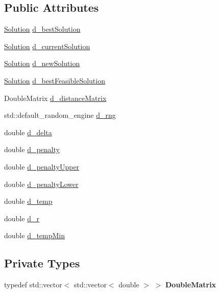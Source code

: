 \subsection*{Public Attributes}
\begin{DoxyCompactItemize}
\item 
\hyperlink{class_solution}{Solution} \hyperlink{class_env_a200b43f8ef6487fd256326a549616e78}{d\+\_\+best\+Solution}
\item 
\hyperlink{class_solution}{Solution} \hyperlink{class_env_a60f53202173a69954e643ef46f16062f}{d\+\_\+current\+Solution}
\item 
\hyperlink{class_solution}{Solution} \hyperlink{class_env_a6109a75656bf4b55567e57369d7b5aa5}{d\+\_\+new\+Solution}
\item 
\hyperlink{class_solution}{Solution} \hyperlink{class_env_a639c27f323c898cb9821f4c64b1a055a}{d\+\_\+best\+Feasible\+Solution}
\item 
Double\+Matrix \hyperlink{class_env_a2686d42335dbafb9c10ebdbe6362e613}{d\+\_\+distance\+Matrix}
\item 
std\+::default\+\_\+random\+\_\+engine \hyperlink{class_env_acde21783d6aed785a78cf914a7215383}{d\+\_\+rng}
\item 
double \hyperlink{class_env_a356dd226bf831c283818b459d66224c4}{d\+\_\+delta}
\item 
double \hyperlink{class_env_a75f5662133f2d29d710c2bf2e2a34229}{d\+\_\+penalty}
\item 
double \hyperlink{class_env_aa6ed2cae83f5d2e6ef14235fad4e050b}{d\+\_\+penalty\+Upper}
\item 
double \hyperlink{class_env_a0524d57e12d574d482af272ce82c95ec}{d\+\_\+penalty\+Lower}
\item 
double \hyperlink{class_env_a629686cbb29294979039c2adb9f19f66}{d\+\_\+temp}
\item 
double \hyperlink{class_env_a8642169aafd7eca86c9ecdcccfdb12f2}{d\+\_\+r}
\item 
double \hyperlink{class_env_a67d0d9d6323ec31b3fa226856afaf93e}{d\+\_\+temp\+Min}
\end{DoxyCompactItemize}
\subsection*{Private Types}
\begin{DoxyCompactItemize}
\item 
\mbox{\label{class_env_a6ab9738ed0a4e1d69e432ca2da48fa3c}} 
typedef std\+::vector$<$ std\+::vector$<$ double $>$ $>$ {\bfseries Double\+Matrix}
\end{DoxyCompactItemize}


